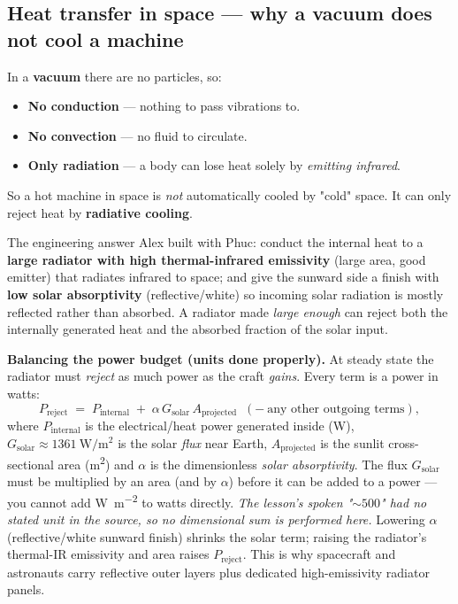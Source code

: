 \documentclass[11pt,a4paper]{article}
\begin{document}
\subsection{Heat transfer in space --- why a vacuum does not cool a machine}

\begin{keybox}
In a \textbf{vacuum} there are no particles, so:
\begin{itemize}[leftmargin=1.4em,itemsep=1pt]
  \item \textbf{No conduction} --- nothing to pass vibrations to.
  \item \textbf{No convection} --- no fluid to circulate.
  \item \textbf{Only radiation} --- a body can lose heat solely by \emph{emitting
        infrared}.
\end{itemize}
So a hot machine in space is \emph{not} automatically cooled by "cold" space. It can only
reject heat by \textbf{radiative cooling}.
\end{keybox}

The engineering answer Alex built with Phuc: conduct the internal heat to a \textbf{large
radiator with high thermal-infrared emissivity} (large area, good emitter) that radiates
infrared to space; and give the sunward side a finish with \textbf{low solar absorptivity}
(reflective/white) so incoming solar radiation is mostly reflected rather than absorbed. A
radiator made \emph{large enough} can reject both the internally generated heat and the
absorbed fraction of the solar input.

\begin{plainbox}
\textbf{Balancing the power budget (units done properly).} At steady state the radiator
must \emph{reject} as much power as the craft \emph{gains}. Every term is a power in watts:
\[
P_{\text{reject}} \;=\; P_{\text{internal}} \;+\; \alpha\, G_{\text{solar}}\, A_{\text{projected}}
\;\;(-\ \text{any other outgoing terms}),
\]
where $P_{\text{internal}}$ is the electrical/heat power generated inside (W), $G_{\text{solar}}
\approx \SI{1361}{\watt\per\metre\squared}$ is the solar \emph{flux} near Earth,
$A_{\text{projected}}$ is the sunlit cross-sectional area (\si{\metre\squared}) and $\alpha$
is the dimensionless \emph{solar absorptivity}. The flux $G_{\text{solar}}$ must be
multiplied by an area (and by $\alpha$) before it can be added to a power --- you cannot add
\si{\watt\per\metre\squared} to watts directly. \emph{The lesson's spoken "$\sim 500$" had no
stated unit in the source, so no dimensional sum is performed here.} Lowering $\alpha$
(reflective/white sunward finish) shrinks the solar term; raising the radiator's
thermal-IR emissivity and area raises $P_{\text{reject}}$. This is why spacecraft and
astronauts carry reflective outer layers plus dedicated high-emissivity radiator panels.
\end{plainbox}
\end{document}

